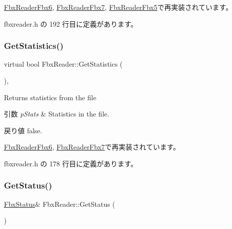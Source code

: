 \hyperlink{class_fbx_reader_fbx6_a62e8d566653eccca7e4b7c914f7a9a5e}{Fbx\+Reader\+Fbx6}, \hyperlink{class_fbx_reader_fbx7_a9079add7d3edeb7af9378ae3a19fec35}{Fbx\+Reader\+Fbx7}, \hyperlink{class_fbx_reader_fbx5_af685112183765e2a278bbbc898374074}{Fbx\+Reader\+Fbx5}で再実装されています。



 fbxreader.\+h の 192 行目に定義があります。

\mbox{\label{class_fbx_reader_ae14762357b4a8ecce10a266b06cc3117}} 
\subsubsection{\texorpdfstring{Get\+Statistics()}{GetStatistics()}}
{\footnotesize\ttfamily virtual bool Fbx\+Reader\+::\+Get\+Statistics (\begin{DoxyParamCaption}\item[{\hyperlink{class_fbx_statistics}{Fbx\+Statistics} $\ast$}]{ }\end{DoxyParamCaption})\hspace{0.3cm}{\ttfamily [inline]}, {\ttfamily [virtual]}}

Returns statistics from the file 
\begin{DoxyParams}{引数}
{\em p\+Stats} & Statistics in the file. \\
\hline
\end{DoxyParams}
\begin{DoxyReturn}{戻り値}
{\ttfamily false}. 
\end{DoxyReturn}


\hyperlink{class_fbx_reader_fbx6_a72865fb347314f30b81b56767fe91a5b}{Fbx\+Reader\+Fbx6}, \hyperlink{class_fbx_reader_fbx7_a674cd0632a4d854d8a7dceb51179e8c9}{Fbx\+Reader\+Fbx7}で再実装されています。



 fbxreader.\+h の 178 行目に定義があります。

\mbox{\label{class_fbx_reader_a7462b93f063eac16b6dd2516c4c3d2f1}} 
\subsubsection{\texorpdfstring{Get\+Status()}{GetStatus()}}
{\footnotesize\ttfamily \hyperlink{class_fbx_status}{Fbx\+Status}\& Fbx\+Reader\+::\+Get\+Status (\begin{DoxyParamCaption}{ }\end{DoxyParamCaption})\hspace{0.3cm}{\ttfamily [inline]}}



